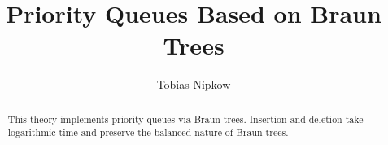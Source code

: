 \documentclass[11pt,a4paper]{article}
\begin{document}
\title{Priority Queues Based on Braun Trees}
\author{Tobias Nipkow}
\maketitle

\begin{abstract}
  This theory implements priority queues via Braun trees. Insertion
  and deletion take logarithmic time and preserve the balanced nature
  of Braun trees.
\end{abstract}

\tableofcontents





\end{document}
